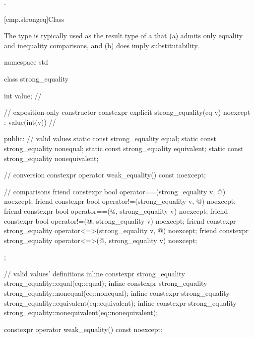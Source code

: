 \begin{itemdescr}
\pnum
\returns
{}.
\end{itemdescr}

[cmp.strongeq]{Class }

\pnum
The  type is typically used
as the result type of a 
that (a) admits only equality and inequality comparisons,
and (b) does imply substitutability.

%
%
%
%
%
\begin{codeblock}
namespace std {
  class strong_equality {
    int value;  // \expos

    // exposition-only constructor
    constexpr explicit strong_equality(eq v) noexcept : value(int(v)) {}    // \expos

  public:
    // valid values
    static const strong_equality equal;
    static const strong_equality nonequal;
    static const strong_equality equivalent;
    static const strong_equality nonequivalent;

    // conversion
    constexpr operator weak_equality() const noexcept;

    // comparisons
    friend constexpr bool operator==(strong_equality v, @\unspec@) noexcept;
    friend constexpr bool operator!=(strong_equality v, @\unspec@) noexcept;
    friend constexpr bool operator==(@\unspec@, strong_equality v) noexcept;
    friend constexpr bool operator!=(@\unspec@, strong_equality v) noexcept;
    friend constexpr strong_equality operator<=>(strong_equality v, @\unspec@) noexcept;
    friend constexpr strong_equality operator<=>(@\unspec@, strong_equality v) noexcept;
  };

  // valid values' definitions
  inline constexpr strong_equality strong_equality::equal(eq::equal);
  inline constexpr strong_equality strong_equality::nonequal(eq::nonequal);
  inline constexpr strong_equality strong_equality::equivalent(eq::equivalent);
  inline constexpr strong_equality strong_equality::nonequivalent(eq::nonequivalent);
}
\end{codeblock}

%
\begin{itemdecl}
constexpr operator weak_equality() const noexcept;
\end{itemdecl}

